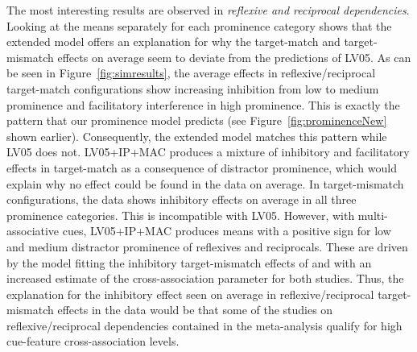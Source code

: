 \documentclass{cambridge7A}\usepackage[]{graphicx}\usepackage[]{color}
\begin{document}
The most interesting results are observed in \emph{reflexive and reciprocal dependencies}.
Looking at the means separately for each prominence category shows that the extended model offers an explanation for why the target-match and target-mismatch effects on average seem to deviate from the predictions of LV05.
As can be seen in Figure~\ref{fig:simresults}, the average effects in reflexive/reciprocal target-match configurations show increasing inhibition from low to medium prominence and facilitatory interference in high prominence. This is exactly the pattern that our prominence model predicts (see Figure~\ref{fig:prominenceNew} shown earlier). Consequently, the extended model matches this pattern while LV05 does not.
LV05+IP+MAC produces a mixture of inhibitory and facilitatory effects in target-match as a consequence of distractor prominence, which would explain why no effect could be found in the data on average.
In target-mismatch configurations, the data shows inhibitory effects on average in all three prominence categories. This is incompatible with LV05. 
However, with multi-associative cues, LV05+IP+MAC produces means with a positive sign for low and medium distractor prominence of reflexives and reciprocals. These are driven by the model fitting the inhibitory target-mismatch effects of \cite{KushPhillips2014} and \cite{JaegerEngelmannVasishth2015} with an increased estimate of the cross-association parameter for both studies. 
Thus, the explanation for the inhibitory effect seen on average in reflexive/reciprocal target-mismatch effects in the data would be that some of the studies on reflexive/reciprocal dependencies contained in the meta-analysis qualify for high cue-feature cross-association levels.
\end{document}
